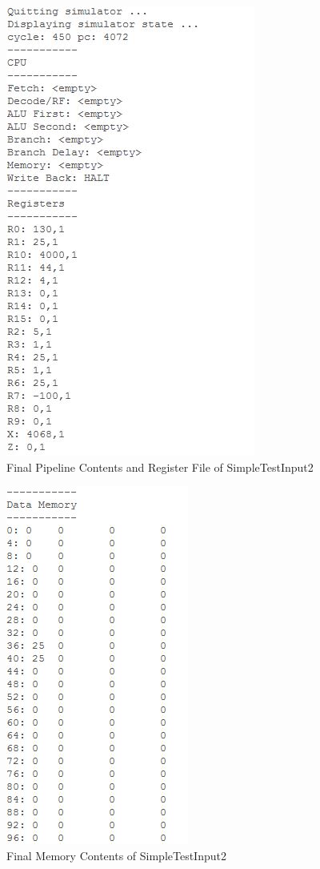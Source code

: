\documentclass[12pt]{article}
\begin{document}
\begin{figure}
  \includegraphics{./figs/sti2pipereg.jpg}
  \caption{Final Pipeline Contents and Register File of SimpleTestInput2}
  \label{fig:sti2pipereg}
\end{figure}
\begin{figure}
  \includegraphics{./figs/sti2mem.jpg}
  \caption{Final Memory Contents of SimpleTestInput2}
  \label{fig:sti2mem}
\end{figure}
\end{document}
